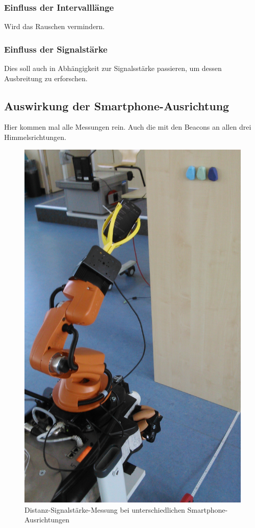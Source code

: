 \subsubsection{Einfluss der Intervalllänge} 
Wird das Rauschen vermindern.
\subsubsection{Einfluss der Signalstärke} 
Dies soll auch in Abhängigkeit zur Signalsstärke passieren, um dessen Ausbreitung zu erforschen.
\subsection{Auswirkung der Smartphone-Ausrichtung}
Hier kommen mal alle Messungen rein. Auch die mit den Beacons an allen drei Himmelsrichtungen.
\begin{figure}[H] 
\centering
\includegraphics[scale=0.3]{Bilder/MessungDrehung}
\caption{Distanz-Signalstärke-Messung bei unterschiedlichen Smartphone-Ausrichtungen}
\end{figure}
